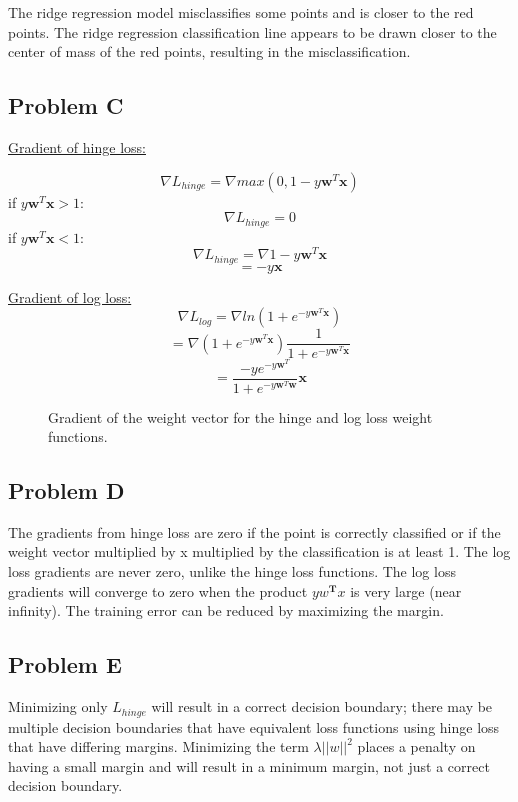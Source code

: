 \documentclass[12pt]{article} %
\begin{document}
The ridge regression model misclassifies some points and is closer to the red points. The ridge regression classification line appears to be drawn closer to the center of mass of the red points, resulting in the misclassification.

\subsection{Problem C}
\underline{Gradient of hinge loss:}

$$\nabla L_{hinge} = \nabla max(0, 1 - y\textbf{w}^{T}\textbf{x})$$
if     $y\textbf{w}^{T}\textbf{x} > 1:$
$$\nabla L_{hinge} = 0$$
if     $y\textbf{w}^{T}\textbf{x}  < 1:$
$$\nabla L_{hinge} = \nabla 1 - y\textbf{w}^{T}\textbf{x}$$
$$ = - y \textbf{x}$$

\underline{Gradient of log loss:}
$$\nabla L_{log} = \nabla ln(1 + e^{-y\textbf{w}^T\textbf{x}})$$
$$= \nabla (1 + e^{-y\textbf{w}^T\textbf{x}}) \frac{1}{1 + e^{-y\textbf{w}^T\textbf{x}}}$$
$$=  \frac{-y e^{-y\textbf{w}^T}}{1 + e^{-y\textbf{w}^T\textbf{w}}}\textbf{x}$$






\begin{figure}[H]
	\vspace{-10mm}
	\caption{Gradient of the weight vector for the hinge and log loss weight functions.}
\end{figure}

\subsection{Problem D}
The gradients from hinge loss are zero if the point is correctly classified or if the weight vector multiplied by x multiplied by the classification is at least 1. The log loss gradients are never zero, unlike the hinge loss functions. The log loss gradients will converge to zero when the product $yw^{\textbf{T}}x$ is very large (near infinity). The training error can be reduced by maximizing the margin.

\subsection{Problem E}
Minimizing only $L_{hinge}$ will result in a correct decision boundary; there may be multiple decision boundaries that have equivalent loss functions using hinge loss that have differing margins. Minimizing the term $\lambda||w||^2$ places a penalty on having a small margin and will result in a minimum margin, not just a correct decision boundary.
\end{document}
